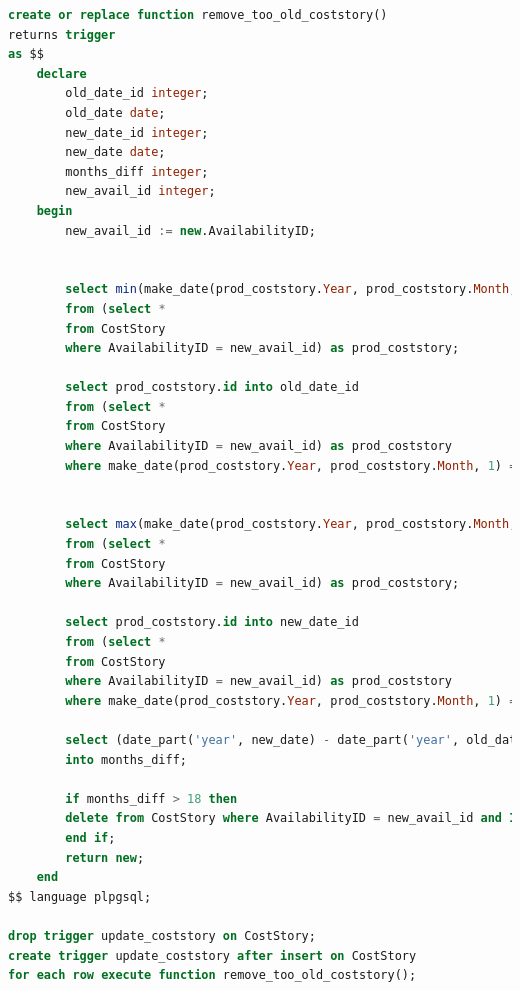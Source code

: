 \documentclass[a4paper,14pt]{extreport}
\begin{document}
\begin{lstlisting}[language=sql, caption={Реализация триггера для обновления истории цен}]
create or replace function remove_too_old_coststory()
returns trigger
as $$
	declare
		old_date_id integer;
		old_date date;
		new_date_id integer;
		new_date date;
		months_diff integer;
		new_avail_id integer;
	begin
		new_avail_id := new.AvailabilityID;
		

		select min(make_date(prod_coststory.Year, prod_coststory.Month, 1)) into old_date
		from (select * 
		from CostStory 
		where AvailabilityID = new_avail_id) as prod_coststory;
		
		select prod_coststory.id into old_date_id
		from (select * 
		from CostStory 
		where AvailabilityID = new_avail_id) as prod_coststory
		where make_date(prod_coststory.Year, prod_coststory.Month, 1) = old_date;
		

		select max(make_date(prod_coststory.Year, prod_coststory.Month, 1)) into new_date
		from (select * 
		from CostStory 
		where AvailabilityID = new_avail_id) as prod_coststory;
		
		select prod_coststory.id into new_date_id
		from (select * 
		from CostStory 
		where AvailabilityID = new_avail_id) as prod_coststory
		where make_date(prod_coststory.Year, prod_coststory.Month, 1) = new_date;
		
		select (date_part('year', new_date) - date_part('year', old_date)) * 12 + (date_part('month', new_date) - date_part('month', old_date)) + 1
		into months_diff;
		
		if months_diff > 18 then
		delete from CostStory where AvailabilityID = new_avail_id and ID = old_date_id;
		end if;
		return new;
	end
$$ language plpgsql;

drop trigger update_coststory on CostStory;
create trigger update_coststory after insert on CostStory
for each row execute function remove_too_old_coststory();
\end{lstlisting}
\end{document}
